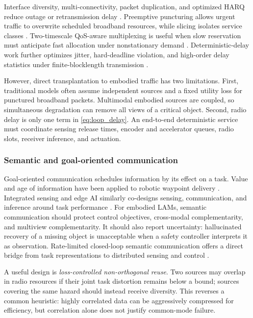 \documentclass[letterpaper,journal]{IEEEtran}
\begin{document}
Interface diversity, multi-connectivity, packet duplication, and optimized
HARQ reduce outage or retransmission delay \cite{interfacediversity,harq}.
Preemptive puncturing allows urgent traffic to overwrite scheduled broadband
resources, while slicing isolates service classes
\cite{puncturing,ranslicing,mobileran}. Two-timescale QoS-aware multiplexing
is useful when slow reservation must anticipate fast allocation under
nonstationary demand \cite{unifiedqos}. Deterministic-delay work further
optimizes jitter, hard-deadline violation, and high-order delay statistics
under finite-blocklength transmission \cite{mixedjitter,deterministic}.

However, direct transplantation to embodied traffic has two limitations.
First, traditional models often assume independent sources and a fixed
utility loss for punctured broadband packets. Multimodal embodied sources are
coupled, so simultaneous degradation can remove all views of a critical
object. Second, radio delay is only one term in
\eqref{eq:loop_delay}. An end-to-end deterministic service must coordinate
sensing release times, encoder and accelerator queues, radio slots, receiver
inference, and actuation.

\subsubsection{Semantic and goal-oriented communication}
Goal-oriented communication schedules information by its effect on a task.
Value and age of information have been applied to robotic waypoint delivery
\cite{waypoint}. Integrated sensing and edge AI similarly co-designs sensing,
communication, and inference around task performance \cite{isea}. For
embodied LAMs, semantic communication should protect control objectives,
cross-modal complementarity, and multiview complementarity. It should also
report uncertainty: hallucinated recovery of a missing object is unacceptable
when a safety controller interprets it as observation. Rate-limited
closed-loop semantic communication offers a direct bridge from task
representations to distributed sensing and control \cite{semanticclosedloop}.

A useful design is \emph{loss-controlled non-orthogonal reuse}. Two sources
may overlap in radio resources if their joint task distortion remains below a
bound; sources covering the same hazard should instead receive diversity.
This reverses a common heuristic: highly correlated data can be aggressively
compressed for efficiency, but correlation alone does not justify common-mode
failure.
\end{document}

